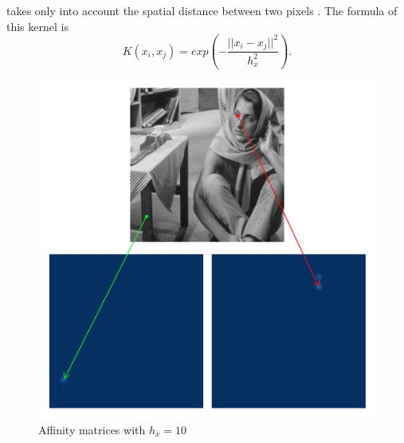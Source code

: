 \begin{description}[align=left]
 \item [Spatial Gaussian Kernel] takes only into account the spatial distance between two pixels \cite{siam_slides_2016}.
  The formula of this kernel is
  \[K(x_i, x_j) = exp(-\frac{||x_i - x_j||^2}{h_x^2}).\]

  \begin{figure}[H]
      \centering
      \includegraphics[width=\textwidth]{img/spatialAffinitySigma10.png}
      \caption{Affinity matrices with \(h_x = 10\)}
  \end{figure}


\end{description}
